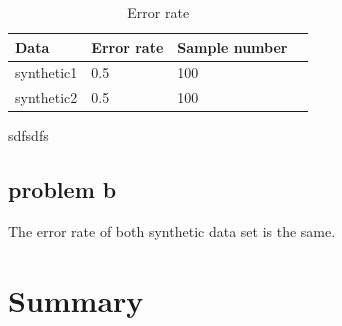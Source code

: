 \documentclass{article}
\begin{document}
		\begin{table}[hbt!]
		\begin{center}
		\begin{tabular}{| l | l | l | p{5cm} |}
		\hline
			Data      & Error rate & Sample number  \\ \hline
			synthetic1& 0.5        & 100    \\  \hline
			synthetic2& 0.5		   & 100   \\   \hline
		\end{tabular}
		\end{center}
	\caption{Error rate}
	\label{table: errorrate}
	\end{table}
sdfsdfs \\
	\subsection{problem b}
The error rate of both synthetic data set is the same.  
	\section{Summary}
	
\end{document}
